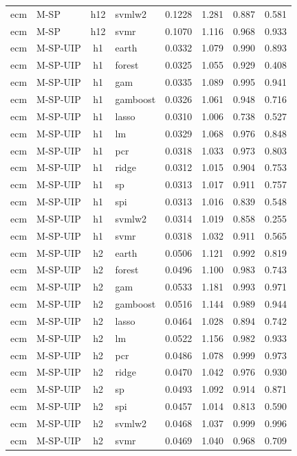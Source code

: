 \begin{ThreePartTable}
\begin{longtable}[t]{llclcccc}
ecm & M-SP & h12 & svmlw2 & 0.1228 & 1.281 & 0.887 & 0.581\\
ecm & M-SP & h12 & svmr & 0.1070 & 1.116 & 0.968 & 0.933\\
\addlinespace
ecm & M-SP-UIP & h1 & earth & 0.0332 & 1.079 & 0.990 & 0.893\\
ecm & M-SP-UIP & h1 & forest & 0.0325 & 1.055 & 0.929 & 0.408\\
ecm & M-SP-UIP & h1 & gam & 0.0335 & 1.089 & 0.995 & 0.941\\
ecm & M-SP-UIP & h1 & gamboost & 0.0326 & 1.061 & 0.948 & 0.716\\
ecm & M-SP-UIP & h1 & lasso & 0.0310 & 1.006 & 0.738 & 0.527\\
ecm & M-SP-UIP & h1 & lm & 0.0329 & 1.068 & 0.976 & 0.848\\
ecm & M-SP-UIP & h1 & pcr & 0.0318 & 1.033 & 0.973 & 0.803\\
ecm & M-SP-UIP & h1 & ridge & 0.0312 & 1.015 & 0.904 & 0.753\\
ecm & M-SP-UIP & h1 & sp & 0.0313 & 1.017 & 0.911 & 0.757\\
ecm & M-SP-UIP & h1 & spi & 0.0313 & 1.016 & 0.839 & 0.548\\
ecm & M-SP-UIP & h1 & svmlw2 & 0.0314 & 1.019 & 0.858 & 0.255\\
ecm & M-SP-UIP & h1 & svmr & 0.0318 & 1.032 & 0.911 & 0.565\\
\addlinespace
ecm & M-SP-UIP & h2 & earth & 0.0506 & 1.121 & 0.992 & 0.819\\
ecm & M-SP-UIP & h2 & forest & 0.0496 & 1.100 & 0.983 & 0.743\\
ecm & M-SP-UIP & h2 & gam & 0.0533 & 1.181 & 0.993 & 0.971\\
ecm & M-SP-UIP & h2 & gamboost & 0.0516 & 1.144 & 0.989 & 0.944\\
ecm & M-SP-UIP & h2 & lasso & 0.0464 & 1.028 & 0.894 & 0.742\\
ecm & M-SP-UIP & h2 & lm & 0.0522 & 1.156 & 0.982 & 0.933\\
ecm & M-SP-UIP & h2 & pcr & 0.0486 & 1.078 & 0.999 & 0.973\\
ecm & M-SP-UIP & h2 & ridge & 0.0470 & 1.042 & 0.976 & 0.930\\
ecm & M-SP-UIP & h2 & sp & 0.0493 & 1.092 & 0.914 & 0.871\\
ecm & M-SP-UIP & h2 & spi & 0.0457 & 1.014 & 0.813 & 0.590\\
ecm & M-SP-UIP & h2 & svmlw2 & 0.0468 & 1.037 & 0.999 & 0.996\\
ecm & M-SP-UIP & h2 & svmr & 0.0469 & 1.040 & 0.968 & 0.709\\

\end{longtable}
\end{ThreePartTable}
